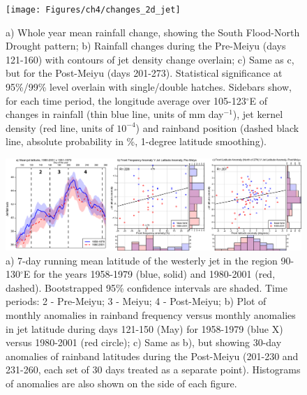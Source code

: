 \begin{figure}
\centering
\noindent\texttt{[image: Figures/ch4/changes\_2d\_jet]}
\caption{a) Whole year mean rainfall change, showing the South Flood-North Drought pattern; b) Rainfall changes during the Pre-Meiyu (days 121-160) with contours of jet density change overlain; c) Same as c, but for the Post-Meiyu (days 201-273). Statistical significance at 95\%/99\% level overlain with single/double hatches. Sidebars show, for each time period, the longitude average over 105-123$^{\circ}$E of changes in rainfall (thin blue line, units of mm day$^{-1}$), jet kernel density (red line, units of $10^{-4}$) and rainband position (dashed black line, absolute probability in \%, 1-degree latitude smoothing).}
\label{fig:changes_2d}
\end{figure}

\begin{figure}[htbp]
\centering
\includegraphics[width=42pc]{Figures/ch4/jet}
\caption{a) 7-day running mean latitude of the westerly jet in the region 90-130$^\circ$E for the years 1958-1979 (blue, solid) and 1980-2001 (red, dashed). Bootstrapped 95\% confidence intervals are shaded. Time periods: 2 - Pre-Meiyu; 3 - Meiyu; 4 - Post-Meiyu; b) Plot of monthly anomalies in rainband frequency versus monthly anomalies in jet latitude during days 121-150 (May) for 1958-1979 (blue X) versus 1980-2001 (red circle); c) Same as b), but showing 30-day anomalies of rainband latitudes during the Post-Meiyu (201-230 and 231-260, each set of 30 days treated as a separate point). Histograms of anomalies are also shown on the side of each figure.}
\label{fig:jet_seasonal}
\end{figure}

